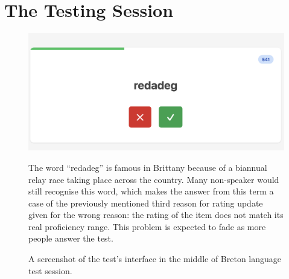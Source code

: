 \section{The Testing Session}
    \begin{figure}
        \centering
        \includegraphics[width=0.5\linewidth]{figures/screenshot-redadeg.png}
        \caption{A screenshot of the test's interface in the middle of Breton language test session.}
        \medskip
        \small
        The word ``redadeg'' is famous in Brittany because of a biannual relay race taking place across the country. Many non-speaker would still recognise this word, which makes the answer from this term a case of the previously mentioned third reason for rating update given for the wrong reason: the rating of the item does not match its real proficiency range. This problem is expected to fade as more people answer the test.
        
    \end{figure}\label{fig:screenshot}
